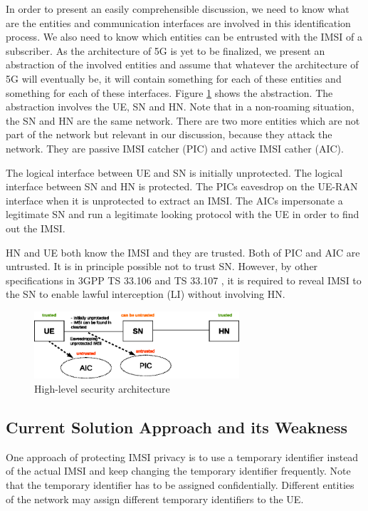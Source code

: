 \documentclass{river-journal}
\begin{document}
In order to present an easily comprehensible discussion, we need to know what are the entities and communication interfaces are involved in this identification process. We also need to know which entities can be entrusted with the IMSI of a subscriber. As the architecture of 5G is yet to be finalized, we present an abstraction of the involved entities and assume that whatever the architecture of 5G will eventually be, it will contain something for each of these entities and something for each of these interfaces. Figure \ref{fig:security_architecture_abstraction} shows the abstraction. The abstraction involves the UE, SN and HN. Note that in a non-roaming situation, the SN and HN are the same network. There are two more entities which are not part of the network but relevant in our discussion, because they attack the network. They are passive IMSI catcher (PIC) and active IMSI cather (AIC). 

The logical interface between UE and SN is initially unprotected. The logical interface between SN and HN is protected. The PICs eavesdrop on the UE-RAN interface when it is unprotected to extract an IMSI. The AICs impersonate a legitimate SN and run a legitimate looking protocol with the UE in order to find out the IMSI. 


HN and UE both know the IMSI and they are trusted. Both of PIC and AIC are untrusted. It is in principle possible not to trust SN. However, by other specifications in 3GPP TS 33.106 \cite{TS33106} and TS 33.107 \cite{TS33107}, it is required to reveal IMSI to the SN to enable lawful interception (LI) without involving HN. \begin{figure}
\begin{center}
  \includegraphics[height= 2.5cm]{security_architecture_abstraction.eps}
\caption{High-level security architecture}
\label{fig:security_architecture_abstraction}       %
\end{center}
\end{figure} 

\subsection{Current Solution Approach and its Weakness}
One approach of protecting IMSI privacy is to use a temporary identifier instead of the actual IMSI and keep changing the temporary identifier frequently. Note that the temporary identifier has to be assigned confidentially. Different entities of the network may assign different temporary identifiers to the UE. 
\end{document}
